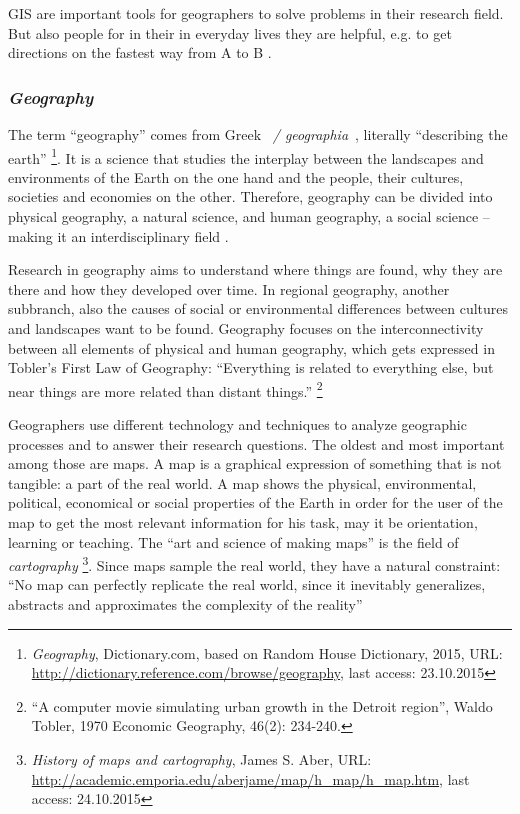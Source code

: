 GIS are important tools for geographers to solve problems in their research field. But also people for in their in everyday lives they are helpful, e.g. to get directions on the fastest way from A to B
\cite{ngGeography}.


\subsubsection{\emph{Geography}} %

The term ``geography'' comes from Greek ~\emph{\textgamma\textepsilon\textomega\textgamma\textrho\textalpha\textphi\textiota\textalpha / geographia}~, literally ``describing the earth''
\footnote{
  \textit{Geography},
  Dictionary.com, based on Random House Dictionary, 2015,
  URL: \url{http://dictionary.reference.com/browse/geography},
  last access: 23.10.2015
}.
It is a science that studies the interplay between the landscapes and environments of the Earth on the one hand and the people, their cultures, societies and economies on the other. Therefore, geography can be divided into physical geography, a natural science, and human geography, a social science -- making it an interdisciplinary field
\cite{rgsGeography}.

Research in geography aims to understand where things are found, why they are there and how they developed over time. In regional geography, another subbranch, also the causes of social or environmental differences between cultures and landscapes want to be found. Geography focuses on the interconnectivity between all elements of physical and human geography, which gets expressed in Tobler's First Law of Geography: ``Everything is related to everything else, but near things are more related than distant things.''
\footnote{
  ``A computer movie simulating urban growth in the Detroit region'',
  Waldo Tobler, 1970
  Economic Geography, 46(2): 234-240.
}

Geographers use different technology and techniques to analyze geographic processes and to answer their research questions. The oldest and most important among those are maps. A map is a graphical expression of something that is not tangible: a part of the real world. A map shows the physical, environmental, political, economical or social properties of the Earth in order for the user of the map to get the most relevant information for his task, may it be orientation, learning or teaching. The ``art and science of making maps'' is the field of \emph{cartography}
\footnote{
  \textit{History of maps and cartography},
  James S. Aber,
  URL: \url{http://academic.emporia.edu/aberjame/map/h_map/h_map.htm},
  last access: 24.10.2015
}. Since maps sample the real world, they have a natural constraint: ``No map can perfectly replicate the real world, since it inevitably generalizes, abstracts and approximates the complexity of the reality''
\cite[p. 181]{knowles2008placing}

